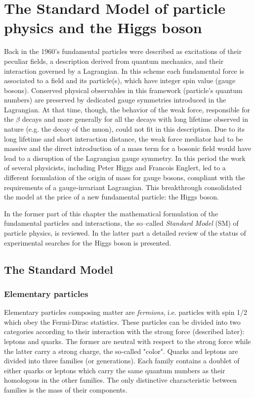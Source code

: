 \chapter[The Higgs boson]{The Standard Model of particle physics and the Higgs boson}

Back in the 1960's fundamental particles were described as excitations of their peculiar fields, a description derived from quantum mechanics, and their interaction governed by a Lagrangian. In this scheme each fundamental force is associated to a field and its particle(s), which have integer spin value (gauge bosons). Conserved physical observables in this framework (particle's quantum numbers) are preserved by dedicated gauge symmetries introduced in the Lagrangian. At that time, though, the behavior of the weak force, responsible for the $\beta$ decays and more generally for all the decays with long lifetime observed in nature (e.g. the decay of the muon), could not fit in this description. Due to its long lifetime and short interaction distance, the weak force mediator had to be massive and the direct introduction of a mass term for a bosonic field would have lead to a disruption of the Lagrangian gauge symmetry. In this period the work of several physicists, including Peter Higgs and Francois Englert, led to a different formulation of the origin of mass for gauge bosons, compliant with the requirements of a gauge-invariant Lagrangian. This breakthrough consolidated the model at the price of a new fundamental particle: the Higgs boson.

In the former part of this chapter the mathematical formulation of the fundamental particles and interactions, the so--called \emph{Standard Model} (SM) of particle physics, is reviewed. In the latter part a detailed review of the status of experimental searches for the Higgs boson is presented.

\section{The Standard Model}
\subsection{Elementary particles}

Elementary particles composing matter are \emph{fermions}, i.e. particles with spin 1/2 which obey the Fermi-Dirac statistics. These particles can be divided into two categories according to their interaction with the strong force (described later): leptons and quarks. The former are neutral with respect to the strong force while the latter carry a strong charge, the so-called "color". Quarks and leptons are divided into three families (or generations). Each family contains a doublet of either quarks or leptons which carry the same quantum numbers as their homologous in the other families. The only distinctive characteristic between families is the mass of their components.

